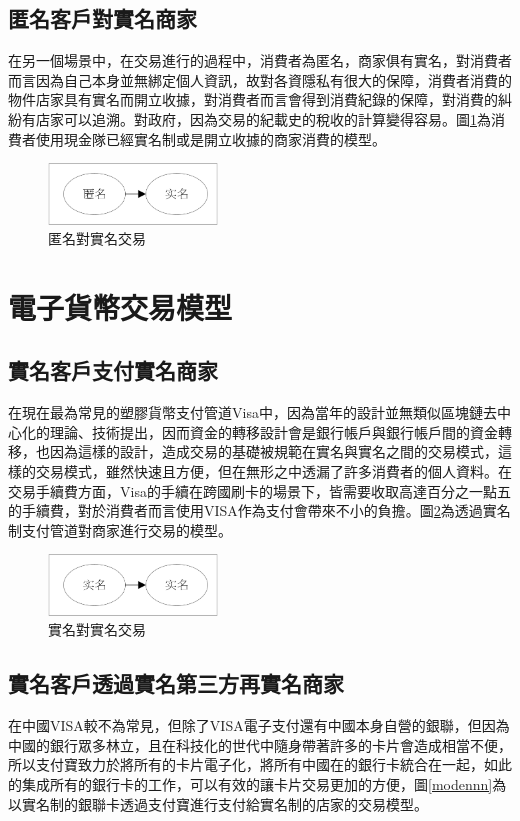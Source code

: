 		\subsection{匿名客戶對實名商家}
		在另一個場景中，在交易進行的過程中，消費者為匿名，商家俱有實名，對消費者而言因為自己本身並無綁定個人資訊，故對各資隱私有很大的保障，消費者消費的物件店家具有實名而開立收據，對消費者而言會得到消費紀錄的保障，對消費的糾紛有店家可以追溯。對政府，因為交易的紀載史的稅收的計算變得容易。圖\ref{modean}為消費者使用現金隊已經實名制或是開立收據的商家消費的模型。

		\begin{figure}[h]
			\centering
			\includegraphics[width = 0.4\textwidth]{modean.png}
			\caption{匿名對實名交易}\label{modean}
		\end{figure}

	\section{電子貨幣交易模型}

		\subsection{實名客戶支付實名商家}
		在現在最為常見的塑膠貨幣支付管道Visa中，因為當年的設計並無類似區塊鏈去中心化的理論、技術提出，因而資金的轉移設計會是銀行帳戶與銀行帳戶間的資金轉移，也因為這樣的設計，造成交易的基礎被規範在實名與實名之間的交易模式，這樣的交易模式，雖然快速且方便，但在無形之中透漏了許多消費者的個人資料。在交易手續費方面，Visa的手續在跨國刷卡的場景下，皆需要收取高達百分之一點五的手續費，對於消費者而言使用VISA作為支付會帶來不小的負擔。圖\ref{modenn}為透過實名制支付管道對商家進行交易的模型。

		\begin{figure}[h]
			\centering
			\includegraphics[width = 0.4\textwidth]{modenn.png}
			\caption{實名對實名交易}\label{modenn}
		\end{figure}

		\subsection{實名客戶透過實名第三方再實名商家}
		在中國VISA較不為常見，但除了VISA電子支付還有中國本身自營的銀聯，但因為中國的銀行眾多林立，且在科技化的世代中隨身帶著許多的卡片會造成相當不便，所以支付寶致力於將所有的卡片電子化，將所有中國在的銀行卡統合在一起，如此的集成所有的銀行卡的工作，可以有效的讓卡片交易更加的方便，圖\ref{modennn}為以實名制的銀聯卡透過支付寶進行支付給實名制的店家的交易模型。

